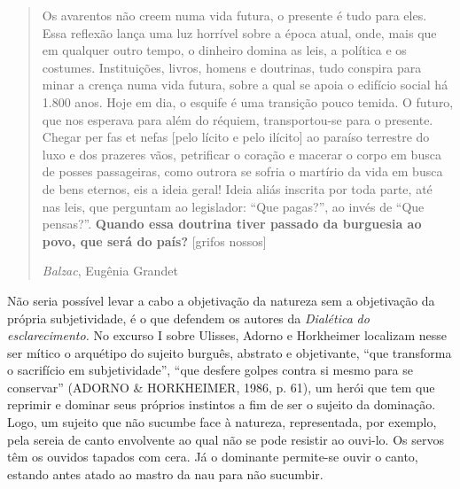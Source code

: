 \begin{quote}
Os avarentos não creem numa vida futura, o presente é tudo para eles.
Essa reflexão lança uma luz horrível sobre a época atual, onde, mais que
em qualquer outro tempo, o dinheiro domina as leis, a política e os
costumes. Instituições, livros, homens e doutrinas, tudo conspira para
minar a crença numa vida futura, sobre a qual se apoia o edifício social
há 1.800 anos. Hoje em dia, o esquife é uma transição pouco temida. O
futuro, que nos esperava para além do réquiem, transportou-se para o
presente. Chegar per fas et nefas {[}pelo lícito e pelo ilícito{]} ao
paraíso terrestre do luxo e dos prazeres vãos, petrificar o coração e
macerar o corpo em busca de posses passageiras, como outrora se sofria o
martírio da vida em busca de bens eternos, eis a ideia geral! Ideia
aliás inscrita por toda parte, até nas leis, que perguntam ao
legislador: ``Que pagas?'', ao invés de ``Que pensas?''. \textbf{Quando
essa doutrina tiver passado da burguesia ao povo, que será do país?}
{[}grifos nossos{]}

\emph{Balzac}, Eugênia Grandet
\end{quote}

Não seria possível levar a cabo a objetivação da natureza sem a
objetivação da própria subjetividade, é o que defendem os autores da
\emph{Dialética} \emph{do} \emph{esclarecimento.} No excurso I sobre
Ulisses, Adorno e Horkheimer localizam nesse ser mítico o arquétipo do
sujeito burguês, abstrato e objetivante, ``que transforma o sacrifício
em subjetividade'', ``que desfere golpes contra si mesmo para se
conservar'' (ADORNO \& HORKHEIMER, 1986, p. 61), um herói que tem que
reprimir e dominar seus próprios instintos a fim de ser o sujeito da
dominação. Logo, um sujeito que não sucumbe face à natureza,
representada, por exemplo, pela sereia de canto envolvente ao qual não
se pode resistir ao ouvi-lo. Os servos têm os ouvidos tapados com cera.
Já o dominante permite-se ouvir o canto, estando antes atado ao mastro
da nau para não sucumbir.

